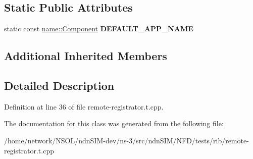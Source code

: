 \subsection*{Static Public Attributes}
\begin{DoxyCompactItemize}
\item 
static const \hyperlink{classndn_1_1name_1_1Component}{name\+::\+Component} {\bfseries D\+E\+F\+A\+U\+L\+T\+\_\+\+A\+P\+P\+\_\+\+N\+A\+ME}\hypertarget{classnfd_1_1rib_1_1tests_1_1RemoteRegistratorFixture_aaf038501ad53c0d11209b9dae13014d6}{}\label{classnfd_1_1rib_1_1tests_1_1RemoteRegistratorFixture_aaf038501ad53c0d11209b9dae13014d6}

\end{DoxyCompactItemize}
\subsection*{Additional Inherited Members}


\subsection{Detailed Description}


Definition at line 36 of file remote-\/registrator.\+t.\+cpp.



The documentation for this class was generated from the following file\+:\begin{DoxyCompactItemize}
\item 
/home/network/\+N\+S\+O\+L/ndn\+S\+I\+M-\/dev/ns-\/3/src/ndn\+S\+I\+M/\+N\+F\+D/tests/rib/remote-\/registrator.\+t.\+cpp\end{DoxyCompactItemize}
